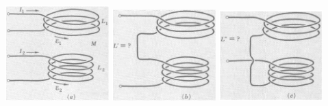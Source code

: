 \documentclass[solutions]{esg8022pset}
\begin{document}
  \begin{center}
    \includegraphics[width = 0.3\textwidth]{pu711a}
    \includegraphics[width = 0.3\textwidth]{pu711b}
    \includegraphics[width = 0.3\textwidth]{pu711c}
  \end{center}
\end{document}
